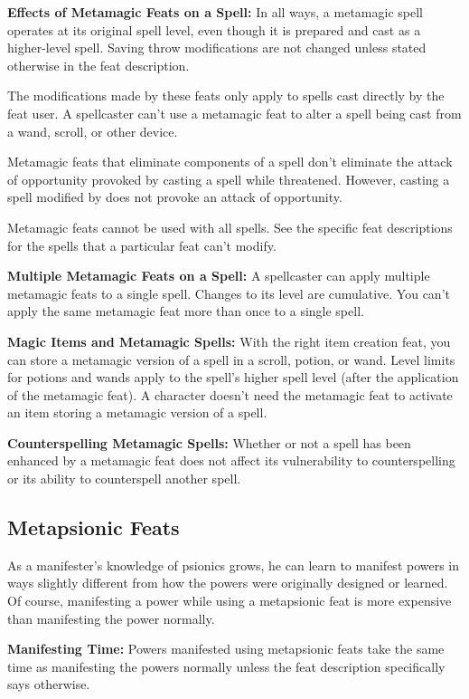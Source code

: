 \textbf{Effects of Metamagic Feats on a Spell:} In all ways, a metamagic spell operates at its original spell level, even though it is prepared and cast as a higher-level spell. Saving throw modifications are not changed unless stated otherwise in the feat description.

The modifications made by these feats only apply to spells cast directly by the feat user. A spellcaster can't use a metamagic feat to alter a spell being cast from a wand, scroll, or other device.

Metamagic feats that eliminate components of a spell don't eliminate the attack of opportunity provoked by casting a spell while threatened. However, casting a spell modified by  does not provoke an attack of opportunity.

Metamagic feats cannot be used with all spells. See the specific feat descriptions for the spells that a particular feat can't modify.

\textbf{Multiple Metamagic Feats on a Spell:} A spellcaster can apply multiple metamagic feats to a single spell. Changes to its level are cumulative. You can't apply the same metamagic feat more than once to a single spell.

\textbf{Magic Items and Metamagic Spells:} With the right item creation feat, you can store a metamagic version of a spell in a scroll, potion, or wand. Level limits for potions and wands apply to the spell's higher spell level (after the application of the metamagic feat). A character doesn't need the metamagic feat to activate an item storing a metamagic version of a spell.

\textbf{Counterspelling Metamagic Spells:} Whether or not a spell has been enhanced by a metamagic feat does not affect its vulnerability to counterspelling or its ability to counterspell another spell.

\subsection{Metapsionic Feats}
As a manifester's knowledge of psionics grows, he can learn to manifest powers in ways slightly different from how the powers were originally designed or learned. Of course, manifesting a power while using a metapsionic feat is more expensive than manifesting the power normally.

\textbf{Manifesting Time:} Powers manifested using metapsionic feats take the same time as manifesting the powers normally unless the feat description specifically says otherwise.

